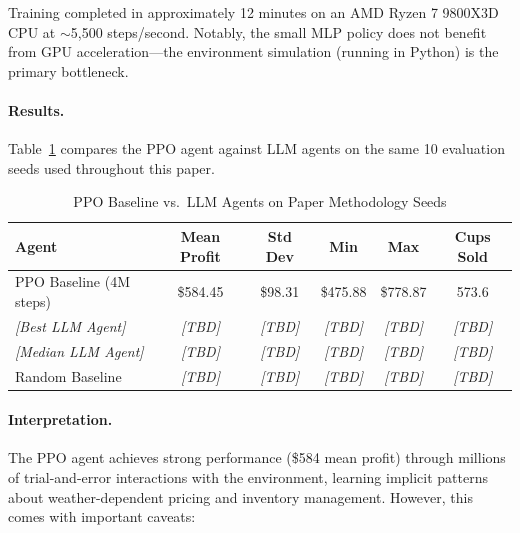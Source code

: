 Training completed in approximately 12 minutes on an AMD Ryzen 7 9800X3D CPU at $\sim$5,500 steps/second. Notably, the small MLP policy does not benefit from GPU acceleration---the environment simulation (running in Python) is the primary bottleneck.

\paragraph{Results.}
Table~\ref{tab:rl-baseline} compares the PPO agent against LLM agents on the same 10 evaluation seeds used throughout this paper.

\begin{table}[h]
\centering
\caption{PPO Baseline vs.\ LLM Agents on Paper Methodology Seeds}
\label{tab:rl-baseline}
\small
\begin{tabular}{@{}lccccc@{}}
\toprule
\textbf{Agent} & \textbf{Mean Profit} & \textbf{Std Dev} & \textbf{Min} & \textbf{Max} & \textbf{Cups Sold} \\
\midrule
PPO Baseline (4M steps) & \$584.45 & \$98.31 & \$475.88 & \$778.87 & 573.6 \\
\midrule
\emph{[Best LLM Agent]} & \emph{[TBD]} & \emph{[TBD]} & \emph{[TBD]} & \emph{[TBD]} & \emph{[TBD]} \\
\emph{[Median LLM Agent]} & \emph{[TBD]} & \emph{[TBD]} & \emph{[TBD]} & \emph{[TBD]} & \emph{[TBD]} \\
Random Baseline & \emph{[TBD]} & \emph{[TBD]} & \emph{[TBD]} & \emph{[TBD]} & \emph{[TBD]} \\
\bottomrule
\end{tabular}
\end{table}

\paragraph{Interpretation.}
The PPO agent achieves strong performance (\$584 mean profit) through millions of trial-and-error interactions with the environment, learning implicit patterns about weather-dependent pricing and inventory management. However, this comes with important caveats:

